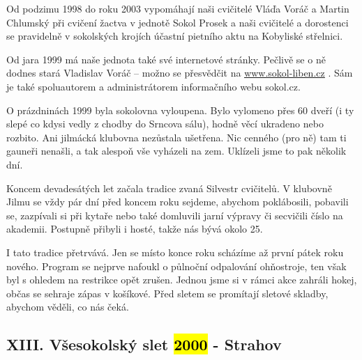Od podzimu 1998 do roku 2003 vypomáhají naši cvičitelé Vláďa Voráč a
Martin Chlumský při cvičení žactva v jednotě Sokol Prosek a naši
cvičitelé a dorostenci se pravidelně v sokolských krojích účastní
pietního aktu na Kobyliské střelnici.

Od jara 1999 má naše jednota také své internetové stránky. Pečlivě se o
ně dodnes stará Vladislav Voráč -- možno se přesvědčit na
\href{http://www.sokol-liben.cz/}{\ul{www.sokol-liben.cz}} . Sám je také
spoluautorem a administrátorem informačního webu sokol.cz.

O prázdninách 1999 byla sokolovna vyloupena. Bylo vylomeno přes 60 dveří
(i ty slepé co kdysi vedly z chodby do Srncova sálu), hodně věcí
ukradeno nebo rozbito. Ani jilmácká klubovna nezůstala ušetřena. Nic
cenného (pro ně) tam ti gauneři nenašli, a tak alespoň vše vyházeli na
zem. Uklízeli jsme to pak několik dní.

Koncem devadesátých let začala tradice zvaná Silvestr cvičitelů. V
klubovně Jilmu se vždy pár dní před koncem roku sejdeme, abychom
poklábosili, pobavili se, zazpívali si při kytaře nebo také domluvili
jarní výpravy či secvičili číslo na akademii. Postupně přibyli i hosté,
takže nás bývá okolo 25.

I tato tradice přetrvává. Jen se místo konce roku scházíme až první
pátek roku nového. Program se nejprve nafoukl o půlnoční odpalování
ohňostroje, ten však byl s ohledem na restrikce opět zrušen. Jednou jsme
si v rámci akce zahráli hokej, občas se sehraje zápas v košíkové. Před
sletem se promítají sletové skladby, abychom věděli, co nás čeká.

\subsection{\texorpdfstring{XIII. Všesokolský slet \hl{2000} -
Strahov}{XIII. Všesokolský slet 2000 - Strahov}}\label{xiii.-vux161esokolskuxfd-slet-2000---strahov}

